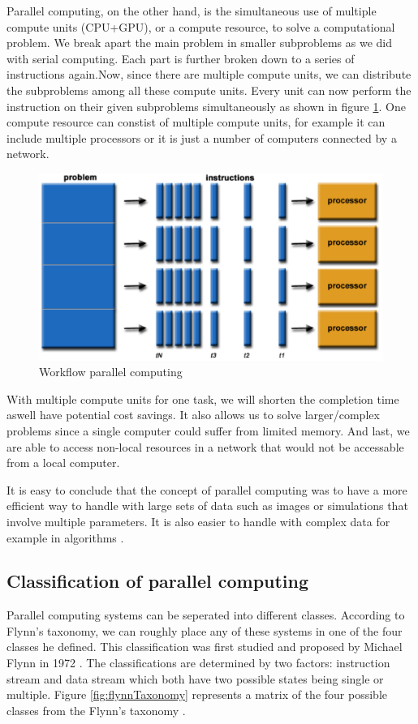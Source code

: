 \documentclass[a4paper, 11pt]{report}
\begin{document}
Parallel computing, on the other hand, is the simultaneous use of multiple compute units (CPU+GPU), or a compute resource, to solve a computational problem. We break apart the main problem in smaller subproblems as we did with serial computing. Each part is further broken down to a series of instructions again.Now, since there are multiple compute units, we can distribute the subproblems among all these compute units. Every unit can now perform the instruction on their given subproblems simultaneously as shown in figure \ref{fig:ParallelC}. One compute resource can constist of multiple compute units, for example it can include multiple processors or it is just a number of computers connected by a network.
	\begin{figure}[h]
		\centering
		\includegraphics[scale=.4]{images/parallelProblem.pdf}
		\caption{Workflow parallel computing}
		\label{fig:ParallelC}
	\end{figure}
With multiple compute units for one task, we will shorten the completion time aswell have potential cost savings. It also allows us to solve larger/complex problems since a single computer could suffer from limited memory. And last, we are able to access non-local resources in a network that would not be accessable from a local computer.

It is easy to conclude that the concept of parallel computing was to have a more efficient way to handle with large sets of data such as images or simulations that involve multiple parameters. It is also easier to handle with complex data for example in algorithms \cite{barney2012parallel}.

	\subsection{Classification of parallel computing}
Parallel computing systems can be seperated into different classes. According to Flynn's taxonomy, we can roughly place any of these systems in one of the four classes he defined. This classification was first studied and proposed by Michael Flynn in 1972 \cite{Unit2COPC}. The classifications are determined by two factors: instruction stream and data stream which both have two possible states being single or multiple. Figure \ref{fig:flynnTaxonomy} represents a matrix of the four possible classes from the Flynn's taxonomy \cite{barney2012parallel}.
\end{document}

